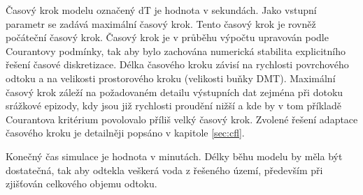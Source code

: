 Časový krok modelu označený \acs{dT} je hodnota v sekundách. Jako vstupní parametr se zadává maximální časový krok. Tento časový krok je rovněž počáteční časový krok. Časový krok je v průběhu výpočtu upravován podle Courantovy podmínky, tak aby bylo zachována numerická stabilita explicitního řešení časové diskretizace. Délka časového kroku závisí na rychlosti povrchového odtoku a na velikosti prostorového kroku (velikosti buňky DMT). Maximální časový krok záleží na požadovaném detailu výstupních dat zejména při dotoku srážkové epizody, kdy jsou již rychlosti proudění nižší a kde by v tom příkladě Courantova kritérium povolovalo příliš velký časový krok. Zvolené řešení adaptace časového kroku je detailněji popsáno v kapitole \ref{sec:cfl}. 



Konečný čas simulace je hodnota v minutách. Délky běhu modelu by měla být dostatečná, tak aby odtekla veškerá voda z řešeného území, především při zjišťován celkového objemu odtoku.
 



